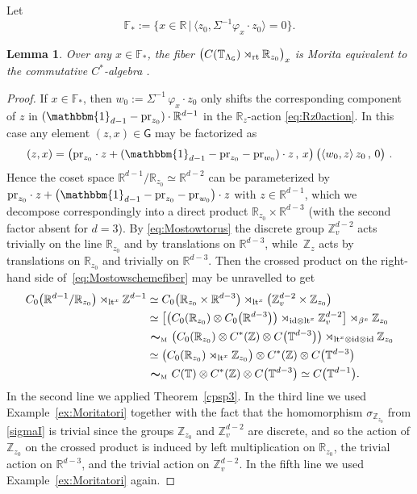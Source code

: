 \documentclass[pdftex]{sigma}
\numberwithin{equation}{section}
\newcommand{\Z}{\zed}
\newcommand{\mbf}[1]{{\boldsymbol {#1} }}
\def\Id{{\rm id}}
\newcommand{\unit}{\mathbbm{1}} 			%
\newcommand{\sfG}{\mathsf{G}}
\newcommand{\lt}{{\rm lt}}
\newcommand{\rt}{{\rm rt}}
\newcommand{\R}{\real}
\newcommand{\zed}{{\mathbb Z}} %
\newcommand{\real}{{\mathbb R}} %
\newcommand{\torus}{{\mathbb T}} %
\newcommand{\proj}{{\rm pr}}
\newtheorem{Lemma}[Theorem]{Lemma}
\begin{document}
Let
\[
\mathbb{F}_* := \big\{x\in\R \, \big| \, \big\langle
z_0,\Sigma^{-1} \varphi_x\cdot z_0\big\rangle=0\big\} .
\]
\begin{Lemma}\label{lem:ellfibercom}
Over any $x\in \mathbb{F}_*$, the fiber
$\big(C(\torus_{\Lambda_\sfG})\rtimes_\rt\real_{ z_0}\big)_x$
is Morita equivalent to the
commutative $C^*$-algebra \smash{$C\big(\torus^{d-1}\big)$}.
\end{Lemma}
\begin{proof}
If $x\in\mathbb{F}_*$, then $w_0:=\Sigma^{-1}\,\varphi_x\cdot z_0$ only
shifts the corresponding component of $ z$ in
$(\unit_{d-1}-\proj_{ z_0})\cdot\R^{d-1}$ in the $\R_{z}$-action
\eqref{eq:Rz0action}. In this case any
element $(z,x)\in\sfG$ may be factorized as
$$
(z,x) = \big(\proj_{ z_0}\cdot
z+(\unit_{d-1}-\proj_{z_0}-\proj_{w_0})\cdot z\,,\,x\big) \,
\big(\langle w_0,z\rangle\, z_0 \,,\,0\big) \ .
$$
Hence the coset space $\R^{d-1}/\R_{ z_0}\simeq\R^{d-2}$ can be
parameterized by $\proj_{ z_0}\cdot
z+\big(\unit_{d-1}-\proj_{z_0}-\proj_{w_0}\big)\cdot z$ with $z\in\R^{d-1}$,
which we decompose correspondingly into a direct product
$\R_{z_0}\times\R^{d-3}$ (with the second factor absent for $d=3$). By \eqref{eq:Mostowtorus} the discrete group
$\Z_v^{d-2}$ acts trivially on the line $\R_{z_0}$ and by translations
on $\R^{d-3}$,
while~$\Z_{ z}$ acts by translations on $\R_{z_0}$ and trivially
on $\R^{d-3}$. Then the crossed product on the right-hand side of~\eqref{eq:Mostowschemefiber} may be unravelled to get
\begin{align*}
C_0\big(\real^{d-1}/\R_{ z_0}\big)\rtimes_{\lt^x}\Z^{d-1}
&\simeq C_0\big(\R_{
 z_0}\times\R^{d-3}\big)\rtimes_{\lt^x}\big(\Z_v^{d-2}\times\Z_{ z_0}\big) \\
&\simeq
\big[\big(C_0(\R_{z_0})\otimes C_0\big(\R^{d-3}\big)\big)\rtimes_{\Id\otimes\lt^x}\Z^{d-2}_v\big]\rtimes_{\beta^x}\Z_{z_0} \\
& \ \mbf\sim_{\text{\tiny M}} \ \big(C_0(\R_{ z_0})\otimes C^*(\Z)\otimes C\big(\torus^{d-3}\big)\big)\rtimes_{\lt^x\otimes\Id\otimes\Id}\Z_{ z_0}
 \\
&\simeq \big(C_0(\R_{ z_0})\rtimes_{\lt^x}\Z_{ z_0}\big)\otimes
C^*(\Z)\otimes C\big(\torus^{d-3}\big)
\nonumber\\
& \ \mbf\sim_{\text{\tiny M}} \ C(\torus)\otimes C^*(\Z)\otimes C\big(\torus^{d-3}\big) \simeq C\big(\torus^{d-1}\big) .
\end{align*}
In the second line we applied
Theorem~\ref{cpsp3}. In the third line we used
Example~\ref{ex:Moritatori} together with the fact that the
homomorphism $\sigma_{\Z_{ z_0}}$ from \eqref{sigmaI} is trivial since the
groups $\Z_{ z_0}$ and $\Z_v^{d-2}$ are discrete, and so the action of $\Z_{ z_0}$ on the crossed
product is induced by left multiplication on $\R_{ z_0}$, the trivial
action on $\R^{d-3}$, and the
trivial action on $\Z_v^{d-2}$. In the fifth line we used
Example~\ref{ex:Moritatori} again.
\end{proof}
\end{document}
